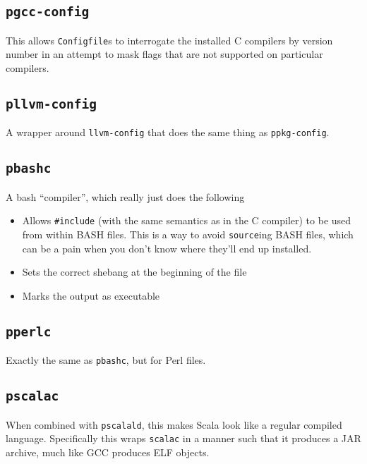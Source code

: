 \documentclass{article}
\begin{document}
\subsection{\texttt{pgcc-config} \label{prog:pgcc-config}}

This allows \texttt{Configfile}s to interrogate the installed C
compilers by version number in an attempt to mask flags that are not
supported on particular compilers.

\subsection{\texttt{pllvm-config} \label{prog:pllvm-config}}

A wrapper around \texttt{llvm-config} that does the same thing as
\texttt{ppkg-config}.

\subsection{\texttt{pbashc} \label{prog:pbashc}}

A bash ``compiler'', which really just does the following
\begin{itemize}
\item Allows \texttt{\#include} (with the same semantics as in the C
  compiler) to be used from within BASH files.  This is a way to avoid
  \texttt{source}ing BASH files, which can be a pain when you don't
  know where they'll end up installed.
\item Sets the correct shebang at the beginning of the file
\item Marks the output as executable
\end{itemize}

\subsection{\texttt{pperlc} \label{prog:pperlc}}

Exactly the same as \texttt{pbashc}, but for Perl files.

\subsection{\texttt{pscalac} \label{prog:pscalac}}

When combined with \texttt{pscalald}, this makes Scala look like a
regular compiled language.  Specifically this wraps \texttt{scalac} in
a manner such that it produces a JAR archive, much like GCC produces
ELF objects.
\end{document}
